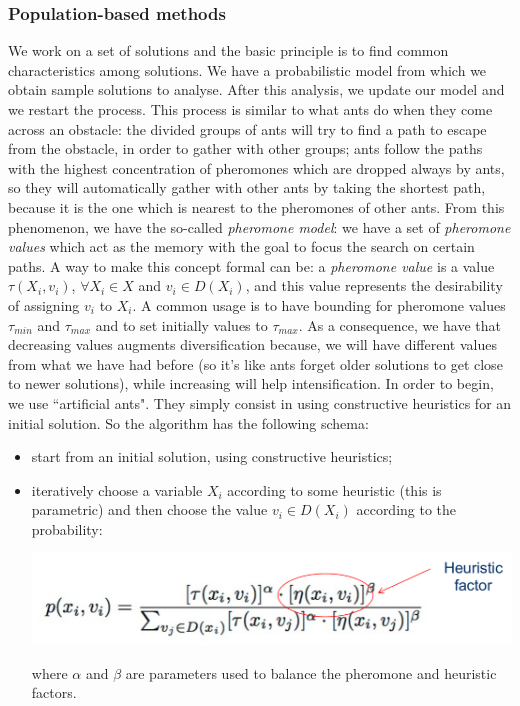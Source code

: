\documentclass[10pt,a4paper]{article}
\begin{document}
\subsubsection{Population-based methods}
We work on a set of solutions and the basic principle is to find common
characteristics among solutions. We have a probabilistic model from which we
obtain sample solutions to analyse. After this analysis, we update our model and
we restart the process. This process is similar to what ants do when they come
across an obstacle: the divided groups of ants will try to find a path to escape
from the obstacle, in order to gather with other groups; ants follow the paths
with the highest concentration of pheromones which are dropped always by ants,
so they will automatically gather with other ants by taking the shortest path,
because it is the one which is nearest to the pheromones of other ants. From
this phenomenon, we have the so-called \textit{pheromone model}: we have a set
of \textit{pheromone values} which act as the memory with the goal to focus the
search on certain paths. A way to make this concept formal can be: a
\textit{pheromone value} is a value $\tau(X_i, v_i)$, $\forall X_i \in X$ and
$v_i \in D(X_i)$, and this value represents the desirability of assigning $v_i$
to $X_i$. A common usage is to have bounding for pheromone values $\tau_{min}$
and $\tau_{max}$ and to set initially values to $\tau_{max}$. As a consequence,
we have that decreasing values augments diversification because, we will have
different values from what we have had before (so it's like ants forget older
solutions to get close to newer solutions), while increasing will help
intensification. In order to begin, we use ``artificial ants". They simply
consist in using constructive heuristics for an initial solution. So the
algorithm has the following schema:
\begin{itemize}
    \item start from an initial solution, using constructive heuristics;
    \item iteratively choose a variable $X_i$ according to some heuristic (this
    is parametric) and then choose the value $v_i \in D(X_i)$ according to the
    probability:

\includegraphics[scale=0.2]{prob_ants.png}    

    where $\alpha$ and $\beta$ are parameters used to balance the pheromone and
    heuristic factors.
\end{itemize}
\end{document}
